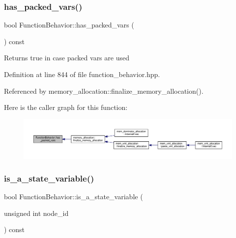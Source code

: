 \subsubsection{\texorpdfstring{has\+\_\+packed\+\_\+vars()}{has\_packed\_vars()}}
{\footnotesize\ttfamily bool Function\+Behavior\+::has\+\_\+packed\+\_\+vars (\begin{DoxyParamCaption}{ }\end{DoxyParamCaption}) const\hspace{0.3cm}{\ttfamily [inline]}}

\begin{DoxyReturn}{Returns}
true in case packed vars are used 
\end{DoxyReturn}


Definition at line 844 of file function\+\_\+behavior.\+hpp.



Referenced by memory\+\_\+allocation\+::finalize\+\_\+memory\+\_\+allocation().

Here is the caller graph for this function\+:
\nopagebreak
\begin{figure}[H]
\begin{center}
\leavevmode
\includegraphics[width=350pt]{d9/d45/classFunctionBehavior_af7f416651e36cf88597c202457bbdef6_icgraph}
\end{center}
\end{figure}
\mbox{\label{classFunctionBehavior_a067992cea7b3f052c5f04a7ac0a8b3d7}} 
\subsubsection{\texorpdfstring{is\+\_\+a\+\_\+state\+\_\+variable()}{is\_a\_state\_variable()}}
{\footnotesize\ttfamily bool Function\+Behavior\+::is\+\_\+a\+\_\+state\+\_\+variable (\begin{DoxyParamCaption}\item[{unsigned int}]{node\+\_\+id }\end{DoxyParamCaption}) const\hspace{0.3cm}{\ttfamily [inline]}}



